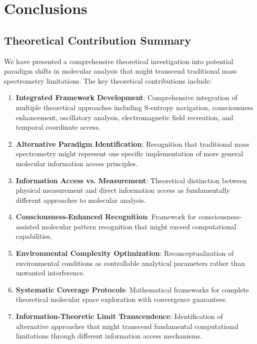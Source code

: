\documentclass[11pt,a4paper]{article}
\theoremstyle{remark}
\begin{document}
{{{{{{{{{{\section{Conclusions}

\subsection{Theoretical Contribution Summary}

We have presented a comprehensive theoretical investigation into potential paradigm shifts in molecular analysis that might transcend traditional mass spectrometry limitations. The key theoretical contributions include:

\begin{enumerate}
\item \textbf{Integrated Framework Development}: Comprehensive integration of multiple theoretical approaches including S-entropy navigation, consciousness enhancement, oscillatory analysis, electromagnetic field recreation, and temporal coordinate access.

\item \textbf{Alternative Paradigm Identification}: Recognition that traditional mass spectrometry might represent one specific implementation of more general molecular information access principles.

\item \textbf{Information Access vs. Measurement}: Theoretical distinction between physical measurement and direct information access as fundamentally different approaches to molecular analysis.

\item \textbf{Consciousness-Enhanced Recognition}: Framework for consciousness-assisted molecular pattern recognition that might exceed computational capabilities.

\item \textbf{Environmental Complexity Optimization}: Reconceptualization of environmental conditions as controllable analytical parameters rather than unwanted interference.

\item \textbf{Systematic Coverage Protocols}: Mathematical frameworks for complete theoretical molecular space exploration with convergence guarantees.

\item \textbf{Information-Theoretic Limit Transcendence}: Identification of alternative approaches that might transcend fundamental computational limitations through different information access mechanisms.
\end{enumerate}

}}}}}}}}}}
\end{document}
